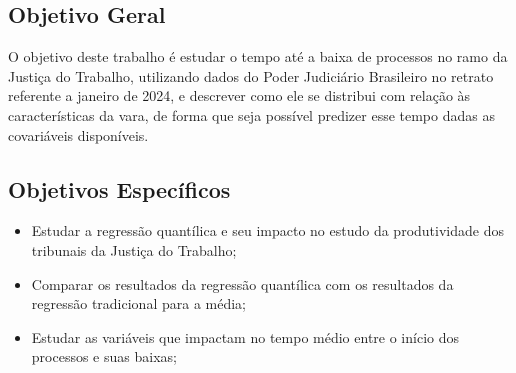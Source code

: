 \subsection{Objetivo Geral}
O objetivo deste trabalho é estudar o tempo até a baixa de processos no ramo da Justiça do Trabalho, utilizando dados do Poder Judiciário Brasileiro no retrato referente a janeiro de 2024, e descrever como ele se distribui com relação às características da vara, de forma que seja possível predizer esse tempo dadas as covariáveis disponíveis.

\subsection{Objetivos Específicos}

\begin{itemize}
    \item Estudar a regressão quantílica e seu impacto no estudo da produtividade dos tribunais da Justiça do Trabalho;
    \item Comparar os resultados da regressão quantílica com os resultados da regressão tradicional para a média;
    \item Estudar as variáveis que impactam no tempo médio entre o início dos processos e suas baixas;
\end{itemize}
